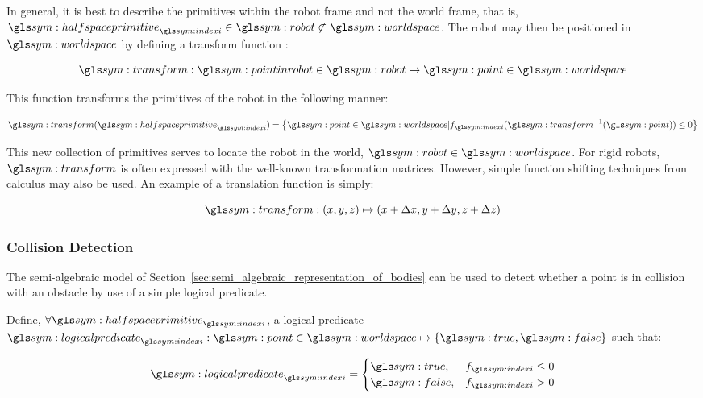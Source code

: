 			In general, it is best to describe the primitives within the robot
			frame and not the world frame, that is,
			$\halfspaceprimitive_{\indexi} \in \robot \not\subset\world$. The
			robot may then be positioned in $\world$ by defining a transform
			function \transform:

			\begin{equation}
				\transform: \pointinrobot\in\robot \mapsto \point\in\world
			\end{equation}

			This function transforms the primitives of the robot in the
			following manner:

			\begin{equation}
				\transform(\halfspaceprimitive_{\indexi}) =
					\left\{
						\point \in \world |
							f_{\indexi}(\transform^{-1}(\point)) \leq 0
					\right\}
			\end{equation}

			This new collection of primitives serves to locate the robot in the
			world, $\robot\in\world$. For rigid robots, $\transform$ is often
			expressed with the well-known transformation matrices. However,
			simple function shifting techniques from calculus may also be used.
			An example of a translation function is simply:

			\begin{equation}
				\transform: (x, y, z) \mapsto (x + \Delta x, y + \Delta y, z + \Delta z)
			\end{equation}

		\subsubsection{Collision Detection}%
		\label{sec:collision_detection}

			The semi-algebraic model of
			Section~\ref{sec:semi_algebraic_representation_of_bodies} can be
			used to detect whether a point is in collision with an obstacle by
			use of a simple logical predicate.

			Define, $\forall\halfspaceprimitive_{\indexi}$, a logical predicate
			\(
				\logicalpredicate_{\indexi}:
					\point\in\world \mapsto \{\true, \false\}
			\)
			such that:

			\begin{equation}
				\logicalpredicate_{\indexi} =
					\begin{cases}
						\true, & f_{\indexi} \leq 0 \\
						\false, & f_{\indexi} > 0
					\end{cases}
			\end{equation}

